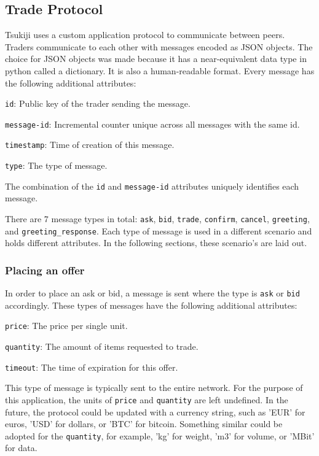 \subsection{Trade Protocol}
\label{protocol}

Tsukiji uses a custom application protocol to communicate between peers.
Traders communicate to each other with messages encoded as JSON objects.
The choice for JSON objects was made because it has a near-equivalent data type in python called a dictionary.
It is also a human-readable format.
Every message has the following additional attributes:
\begin{myitemize}
\item \texttt{id}: Public key of the trader sending the message.
\item \texttt{message-id}: Incremental counter unique across all messages with the same id.
\item \texttt{timestamp}: Time of creation of this message.
\item \texttt{type}: The type of message.
\end{myitemize}
The combination of the \texttt{id} and \texttt{message-id} attributes uniquely identifies each message.

There are 7 message types in total: \texttt{ask}, \texttt{bid}, \texttt{trade}, \texttt{confirm}, \texttt{cancel}, \texttt{greeting}, and \texttt{greeting\_response}. Each type of message is used in a different scenario and holds different attributes. In the following sections, these scenario's are laid out.

\subsubsection{Placing an offer}
In order to place an ask or bid, a message is sent where the type is \texttt{ask} or \texttt{bid} accordingly.
These types of messages have the following additional attributes:
\begin{myitemize}
\item \texttt{price}: The price per single unit.
\item \texttt{quantity}: The amount of items requested to trade.
\item \texttt{timeout}: The time of expiration for this offer.
\end{myitemize}
This type of message is typically sent to the entire network.
For the purpose of this application, the units of \texttt{price} and \texttt{quantity} are left undefined.
In the future, the protocol could be updated with a currency string, such as 'EUR' for euros, 'USD' for dollars, or 'BTC' for bitcoin.
Something similar could be adopted for the \texttt{quantity}, for example, 'kg' for weight, 'm3' for volume, or 'MBit' for data.

